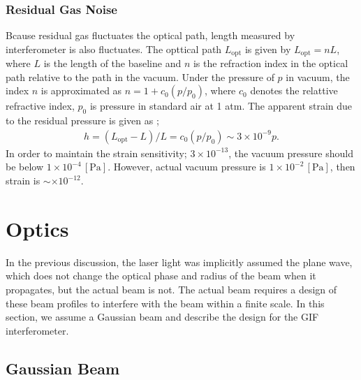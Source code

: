 \subsubsection{Residual Gas Noise}
Bcause residual gas fluctuates the optical path, length measured by interferometer is also fluctuates. The opttical path $L_{\mathrm{opt}}$ is given by $L_{\mathrm{opt}}=nL$, where $L$ is the length of the baseline and $n$ is the refraction index in the optical path relative to the path in the vacuum. Under the pressure of $p$ in vacuum, the index $n$ is approximated as $n = 1 + c_0(p/p_0)$, where $c_0$ denotes the relattive refractive index, $p_0$ is pressure in standard air at 1 atm. The apparent strain due to the residual pressure is given as \cite{ciddor1996refractive};
\begin{eqnarray}
  h = (L_{\mathrm{opt}}-L)/L = c_0(p/p_0) \sim 3\times10^{-9} p.
\end{eqnarray}
In order to maintain the strain sensitivity; $3\times10^{-13}$, the vacuum pressure should be below $1\times10^{-4}\,[\mathrm{Pa}]$. However, actual vacuum pressure is $1\times10^{-2}\,[\mathrm{Pa}]$, then strain is $\sim\times10^{-12}$.


\section{Optics} \label{sec:sec43}
In the previous discussion, the laser light was implicitly assumed the plane wave, which does not change the optical phase and radius of the beam when it propagates, but the actual beam is not. The actual beam requires a design of these beam profiles to interfere with the beam within a finite scale. In this section, we assume a Gaussian beam and describe the design for the GIF interferometer.

\subsection{Gaussian Beam}
